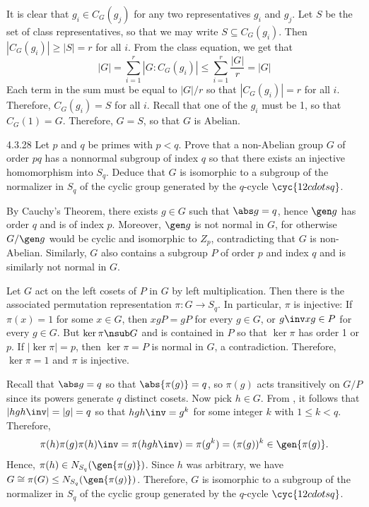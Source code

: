 \begin{sol}
	It is clear that $g_i \in C_G(g_j)$ for any two representatives $g_i$ and $g_j$.
	Let $S$ be the set of class representatives, so that we may write $S \subseteq C_G(g_i)$.
	Then $|C_G(g_i)| \geq |S| = r$ for all $i$.
	From the class equation, we get that
	\[
		|G| = \sum_{i = 1}^r |G : C_G(g_i)| \leq \sum_{i = 1}^r \frac{|G|}{r} = |G|
	\]
	Each term in the sum must be equal to $|G|/r$ so that $|C_G(g_i)| = r$ for all $i$.
	Therefore, $C_G(g_i) = S$ for all $i$.
	Recall that one of the $g_i$ must be 1, so that $C_G(1) = G$.
	Therefore, $G = S$, so that $G$ is Abelian.
\end{sol}

\begin{exercise}{4.3.28}
	Let $p$ and $q$ be primes with $p < q$.
	Prove that a non-Abelian group $G$ of order $pq$ has a nonnormal subgroup of index $q$ so that there exists an injective homomorphism into $S_q$.
	Deduce that $G$ is isomorphic to a subgroup of the normalizer in $S_q$ of the cyclic group generated by the $q$-cycle $\cyc{1 2 cdots q}$.
\end{exercise}

\begin{sol}
	By Cauchy's Theorem, there exists $g \in G$ such that $\abs g = q$, hence $\gen g$ has order $q$ and is of index $p$.
	Moreover, $\gen g$ is not normal in $G$, for otherwise $G/\gen g$ would be cyclic and isomorphic to $Z_p$, contradicting that $G$ is non-Abelian.
	Similarly, $G$ also contains a subgroup $P$ of order $p$ and index $q$ and is similarly not normal in $G$.

	Let $G$ act on the left cosets of $P$ in $G$ by left multiplication.
	Then there is the associated permutation representation $\pi : G \to S_q$.
	In particular, $\pi$ is injective: If $\pi(x) = 1$ for some $x \in G$, then $xgP = gP$ for every $g \in G$, or $g\inv xg \in P$ for every $g \in G$.
	But $\ker\pi \nsub G$ and is contained in $P$ so that $\ker\pi$ has order 1 or $p$.
	If $|\ker\pi| = p$, then $\ker\pi = P$ is normal in $G$, a contradiction.
	Therefore, $\ker\pi = 1$ and $\pi$ is injective.

	Recall that $\abs g = q$ so that $\abs{\pi(g)} = q$, so $\pi(g)$ acts transitively on $G/P$ since its powers generate $q$ distinct cosets.
	Now pick $h \in G$.
	From , it follows that $|hgh\inv| = |g| = q$ so that $hgh\inv = g^k$ for some integer $k$ with $1 \leq k < q$.
	Therefore,
	\[
		\pi(h)\pi(g)\pi(h)\inv = \pi(hgh\inv) = \pi(g^k) = (\pi(g))^k \in \gen{\pi(g)}.
	\]
	Hence, $\pi(h) \in N_{S_q}(\gen{\pi(g)})$.
	Since $h$ was arbitrary, we have $G \cong \pi(G) \leq N_{S_q}(\gen{\pi(g)})$.
	Therefore, $G$ is isomorphic to a subgroup of the normalizer in $S_q$ of the cyclic group generated by the $q$-cycle $\cyc{1 2 cdots q}$.
\end{sol}

